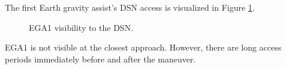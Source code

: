 \documentclass[]{aiaa-tc}%
\begin{document}
The first Earth gravity assist's DSN access is visualized in Figure \ref{fig:EGA1_Access}.
	\begin{figure}[H]
		\centering
		\caption{EGA1 visibility to the DSN. }
		\label{fig:EGA1_Access}
	\end{figure}	
EGA1 is not visible at the closest approach. However, there are long access periods immediately before and after the maneuver. 

	\vspace{5 mm}
\end{document}
